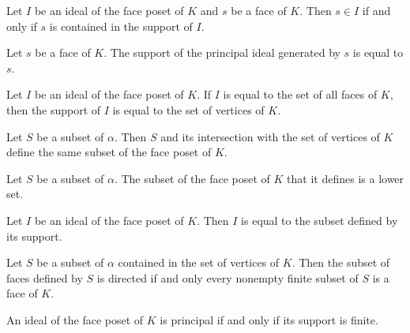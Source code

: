 \begin{sublemma}
Let $I$ be an ideal of the face poset of $K$ and $s$ be a face of $K$. Then $s\in I$ if and only if $s$ is contained in the
support of $I$.

\end{sublemma}

\begin{sublemma}
Let $s$ be a face of $K$. The support of the principal ideal generated by $s$ is equal to $s$.

\end{sublemma}

\begin{sublemma}
Let $I$ be an ideal of the face poset of $K$. If $I$ is equal to the set of all faces of $K$, then the support of $I$
is equal to the set of vertices of $K$.

\end{sublemma}

\begin{sublemma}
Let $S$ be a subset of $\alpha$. Then $S$ and its intersection with the set of vertices of $K$ define the same subset
of the face poset of $K$.

\end{sublemma}

\begin{sublemma}
Let $S$ be a subset of $\alpha$. The subset of the face poset of $K$ that it defines is a lower set.

\end{sublemma}

\begin{sublemma}[IdealFromSupport]
Let $I$ be an ideal of the face poset of $K$. Then $I$ is equal to the subset defined by its support.

\end{sublemma}

\begin{sublemma}
Let $S$ be a subset of $\alpha$ contained in the set of vertices of $K$. Then the subset of faces defined by $S$ is
directed if and only every nonempty finite subset of $S$ is a face of $K$.

\end{sublemma}

\begin{sublemma}
An ideal of the face poset of $K$ is principal if and only if its support is finite.

\end{sublemma}

